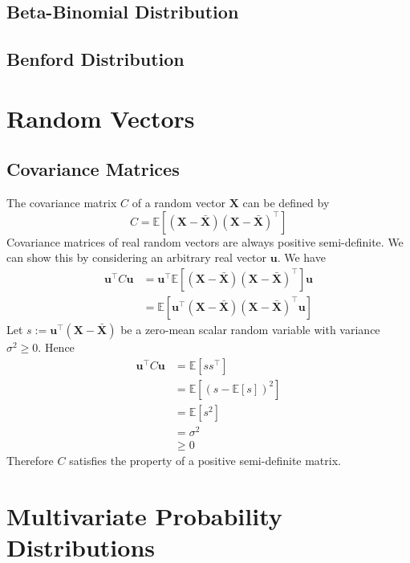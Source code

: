 \documentclass[11pt]{report} %
\begin{document}
\subsection{Beta-Binomial Distribution}

\subsection{Benford Distribution}

\section{Random Vectors}

\subsection{Covariance Matrices}
The covariance matrix $C$ of a random vector $\mathbf{X}$ can be defined by
\begin{equation}
C = \mathbb{E}\left[\left(\mathbf{X} - \bar{\mathbf{X}}\right)\left(\mathbf{X} - \bar{\mathbf{X}}\right)^{\top}\right]
\end{equation}
Covariance matrices of real random vectors are always positive semi-definite. We can show this by considering an arbitrary real vector $\mathbf{u}$. We have
\begin{align}
\mathbf{u}^{\top}C\mathbf{u} &= \mathbf{u}^{\top}\mathbb{E}\left[\left(\mathbf{X} - \bar{\mathbf{X}}\right)\left(\mathbf{X} - \bar{\mathbf{X}}\right)^{\top}\right]\mathbf{u} \\
&= \mathbb{E}\left[\mathbf{u}^{\top}\left(\mathbf{X} - \bar{\mathbf{X}}\right)\left(\mathbf{X} - \bar{\mathbf{X}}\right)^{\top}\mathbf{u}\right]
\end{align}
Let $s := \mathbf{u}^{\top}\left(\mathbf{X} - \bar{\mathbf{X}}\right)$ be a zero-mean scalar random variable with variance $\sigma^{2} \geq 0$. Hence
\begin{align}
\mathbf{u}^{\top}C\mathbf{u} &= \mathbb{E}\left[ss^{\top}\right] \\
&= \mathbb{E}\left[\left(s - \mathbb{E}\left[s\right]\right)^{2}\right] \\
&= \mathbb{E}\left[s^{2}\right] \\
&= \sigma^{2} \\
&\geq 0
\end{align}
Therefore $C$ satisfies the property of a positive semi-definite matrix.

\section{Multivariate Probability Distributions}
\end{document}
